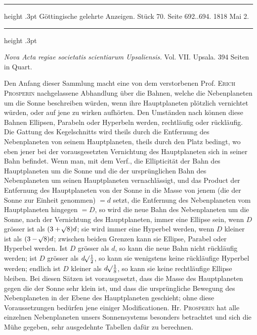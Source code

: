 \par\bigskip
\hypertarget{native-609-lower}{}
\begin{center}
\parbox{.81\linewidth}{%
\centering\small
\hrule height .3pt\relax\vspace{2.5pt}
Göttingische gelehrte Anzeigen. Stück 70. Seite 692..694. 1818 Mai 2.\par
\vspace{2.5pt}\hrule height .3pt\relax
}
\end{center}

\emph{Nova Acta regiae societatis scientiarum Upsaliensis.} Vol. VII. Upsala. 394 Seiten in Quart.

Den Anfang dieser Sammlung macht eine von dem verstorbenen Prof. \textsc{Erich Prosperin} nachgelassene Abhandlung über die Bahnen, welche die Nebenplaneten um die Sonne beschreiben würden,
wenn ihre Hauptplaneten plötzlich vernichtet würden, oder auf jene zu wirken aufhörten. Den Umständen nach können diese Bahnen Ellipsen, Parabeln oder Hyperbeln werden, rechtläufig oder rückläufig. Die Gattung des Kegelschnitts wird theils durch die Entfernung des Nebenplaneten von seinem
Hauptplaneten, theils durch den Platz bedingt, wo eben jener bei der vorausgesetzten Vernichtung des
Hauptplaneten sich in seiner Bahn befindet. Wenn man, mit dem Verf., die Ellipticität der Bahn des
Hauptplaneten um die Sonne und die der ursprünglichen Bahn des Nebenplaneten um seinen Hauptplaneten vernachlässigt, und das Product der Entfernung des Hauptplaneten von der Sonne in die Masse
von jenem (die der Sonne zur Einheit genommen) $= d$ setzt, die Entfernung des Nebenplaneten vom
Hauptplaneten hingegen $= D$, so wird die neue Bahn des Nebenplaneten um die Sonne, nach der Vernichtung des Hauptplaneten, immer eine Ellipse sein, wenn $D$ grösser ist als $(3+\mathord{{}^{}\!\surd}8)d$; sie wird immer eine Hyperbel werden, wenn $D$ kleiner ist als $(3-\mathord{{}^{}\!\surd}8)d$; zwischen beiden Grenzen kann sie Ellipse, Parabel oder Hyperbel werden. Ist $D$ grösser als $d$, so kann die neue Bahn nicht rückläufig
werden; ist $D$ grösser als $d\mathord{{}^{}\!\surd}\tfrac{1}{2}$, so kann sie wenigstens keine rückläufige Hyperbel werden; endlich ist
$D$ kleiner als $d\mathord{{}^{}\!\surd}\tfrac{1}{8}$, 
so kann sie keine rechtläufige Ellipse bleiben. Bei diesen Sätzen ist vorausgesetzt,
dass die Masse des Hauptplaneten gegen die der Sonne sehr klein ist, und dass die ursprüngliche Bewegung des Nebenplaneten in der Ebene des Hauptplaneten geschieht; ohne diese Voraussetzungen bedürfen jene einiger Modificationen. Hr. \textsc{Prosperin} hat alle einzelnen Nebenplaneten unsers Sonnensystems besonders betrachtet und sich die Mühe gegeben, sehr ausgedehnte Tabellen dafür zu berechnen.
